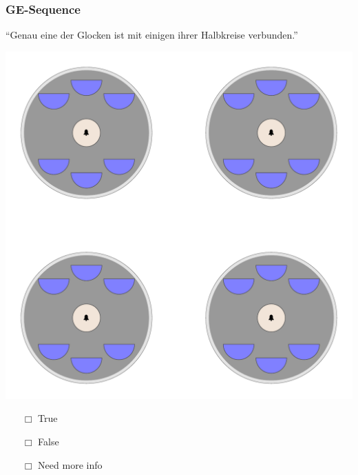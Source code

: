 \documentclass[fleqn,10pt,xcolor=dvipsnames]{beamer}
\newcommand{\GE}{GE\xspace}
\newcommand{\mymark}[1]{{\color{mycol}{#1}}}
\begin{document}
\begin{frame}
  \frametitle{\GE-Sequence}
  \begin{center}
    ``Genau eine der Glocken ist mit einigen ihrer Halbkreise verbunden.''

    \vspace{0.1cm}

    \includegraphics[width=0.5 \textwidth]{../../pictures/ge_01_1.pdf}

    \vspace{0.1cm}

    \begin{multicols}{3}
      \begin{itemize} 
      \item[$\Box$] True\\
        \onslide<2>{$\leadsto$  \mymark{false}}
      \item[$\Box$] False\\
        \onslide<2>{$\leadsto$ \mymark{false}}
      \item[$\Box$] Need more info 
      \end{itemize}
    \end{multicols}

  \end{center}
\end{frame}
\end{document}
